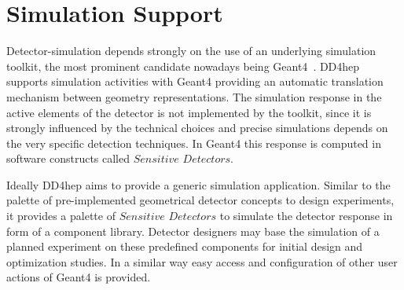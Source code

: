 \documentclass[a4paper]{jpconf}
\begin{document}
\section{Simulation Support}
\label{subsect:simulation-support}
\noindent
Detector-simulation depends strongly on the use of an underlying simulation toolkit, 
the most prominent candidate nowadays being Geant4~\cite{bib:geant4}.
DD4hep supports simulation activities with Geant4 providing
an automatic translation mechanism between geometry representations.
The simulation response in the active elements of the detector
is not implemented by the toolkit, since it is strongly influenced by the technical 
choices and precise simulations depends on the very specific detection techniques.
In Geant4 this response is computed in software constructs called $Sensitive$ 
$Detectors$.

\noindent
Ideally DD4hep aims to provide a generic simulation application.
Similar to the palette of pre-implemented geometrical detector 
concepts to design experiments, it provides a palette of $Sensitive$
$Detectors$ to simulate the detector response in form of a component library.
Detector designers may base the simulation of a planned experiment 
on these predefined components for initial design and optimization 
studies.  In a similar way easy access
and configuration of other user actions of Geant4 is provided.

\end{document}
